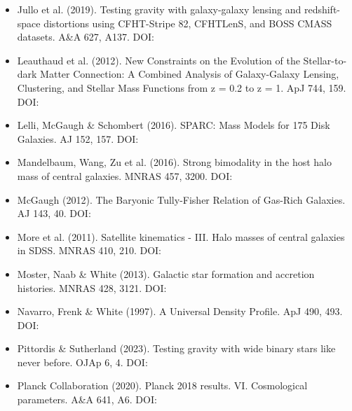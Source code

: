 \documentclass[11pt,a4paper]{article}
\begin{document}
\begin{itemize}
  \item Jullo et al. (2019). Testing gravity with galaxy-galaxy lensing and redshift-space distortions using CFHT-Stripe 82, CFHTLenS, and BOSS CMASS datasets. A\&A 627, A137. DOI: \href{https://doi.org/10.1051/0004-6361/201834629}{{\small\protect{}}}
  \item Leauthaud et al. (2012). New Constraints on the Evolution of the Stellar-to-dark Matter Connection: A Combined Analysis of Galaxy-Galaxy Lensing, Clustering, and Stellar Mass Functions from z = 0.2 to z = 1. ApJ 744, 159. DOI: \href{https://doi.org/10.1088/0004-637X/744/2/159}{{\small\protect{}}}
  \item Lelli, McGaugh \& Schombert (2016). SPARC: Mass Models for 175 Disk Galaxies. AJ 152, 157. DOI: \href{https://doi.org/10.3847/0004-6256/152/6/157}{{\small\protect{}}}
  \item Mandelbaum, Wang, Zu et al. (2016). Strong bimodality in the host halo mass of central galaxies. MNRAS 457, 3200. DOI: \href{https://doi.org/10.1093/mnras/stw188}{{\small\protect{}}}
  \item McGaugh (2012). The Baryonic Tully-Fisher Relation of Gas-Rich Galaxies. AJ 143, 40. DOI: \href{https://doi.org/10.1088/0004-6256/143/2/40}{{\small\protect{}}}
  \item More et al. (2011). Satellite kinematics  -  III. Halo masses of central galaxies in SDSS. MNRAS 410, 210. DOI: \href{https://doi.org/10.1111/j.1365-2966.2010.17436.x}{{\small\protect{}}}
  \item Moster, Naab \& White (2013). Galactic star formation and accretion histories. MNRAS 428, 3121. DOI: \href{https://doi.org/10.1093/mnras/sts261}{{\small\protect{}}}
  \item Navarro, Frenk \& White (1997). A Universal Density Profile. ApJ 490, 493. DOI: \href{https://doi.org/10.1086/304888}{{\small\protect{}}}
  \item Pittordis \& Sutherland (2023). Testing gravity with wide binary stars like never before. OJAp 6, 4. DOI: \href{https://doi.org/10.21105/astro.2205.02846}{{\small\protect{}}}
  \item Planck Collaboration (2020). Planck 2018 results. VI. Cosmological parameters. A\&A 641, A6. DOI: \href{https://doi.org/10.1051/0004-6361/201833910}{{\small\protect{}}}

\end{itemize}
\end{document}
